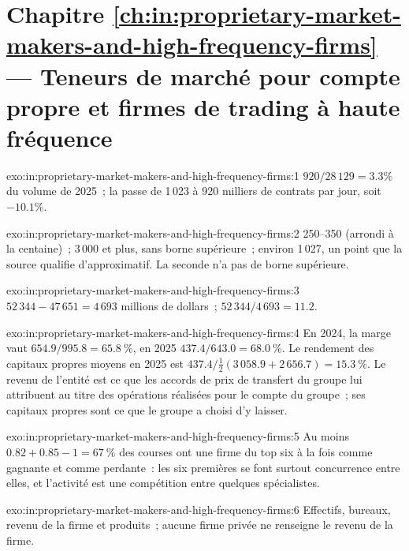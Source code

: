 \section*{Chapitre \ref{ch:in:proprietary-market-makers-and-high-frequency-firms} --- Teneurs de marché pour compte propre et firmes de trading à haute fréquence}

\begin{solution}{exo:in:proprietary-market-makers-and-high-frequency-firms:1}
$920/28\,129=3.3\%$ du volume de 2025~; la  passe de 1\,023 à 920 milliers de contrats par jour, soit $-10.1\%$.
\end{solution}

\begin{solution}{exo:in:proprietary-market-makers-and-high-frequency-firms:2}
250--350 (arrondi à la centaine)~; 3\,000 et plus, sans borne supérieure~; environ 1\,027, un point que la source qualifie
d'approximatif. La seconde n'a pas de borne supérieure.
\end{solution}

\begin{solution}{exo:in:proprietary-market-makers-and-high-frequency-firms:3}
$52\,344-47\,651=4\,693$ millions de dollars~; $52\,344/4\,693=11.2$.
\end{solution}

\begin{solution}{exo:in:proprietary-market-makers-and-high-frequency-firms:4}
En 2024, la marge vaut $654.9/995.8=65.8~\%$, en 2025 $437.4/643.0=68.0~\%$. Le rendement des capitaux propres moyens en 2025 est
$437.4/\tfrac12(3\,058.9+2\,656.7)=15.3~\%$. Le revenu de l'entité est ce que les accords de prix de transfert du groupe
lui attribuent au titre des opérations réalisées pour le compte du groupe~; ses capitaux propres sont ce que le groupe a choisi d'y laisser.
\end{solution}

\begin{solution}{exo:in:proprietary-market-makers-and-high-frequency-firms:5}
Au moins $0.82+0.85-1=67~\%$ des courses ont une firme du top six à la fois comme gagnante et comme perdante~: les six premières se font surtout
concurrence entre elles, et l'activité est une compétition entre quelques spécialistes.
\end{solution}

\begin{solution}{exo:in:proprietary-market-makers-and-high-frequency-firms:6}
Effectifs, bureaux, revenu de la firme et produits~; aucune firme privée ne renseigne le revenu de la firme.
\end{solution}


